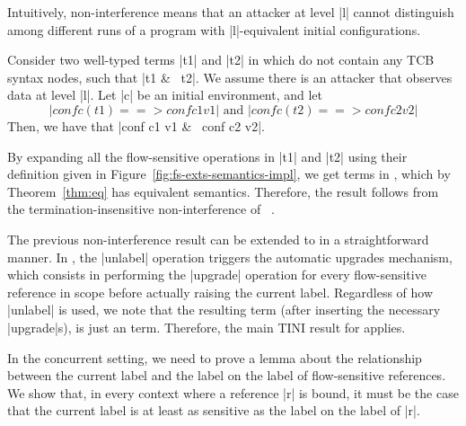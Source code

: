 Intuitively, non-interference means that an attacker at level |l|
cannot distinguish among different runs of a program with
|l|-equivalent initial configurations.

\begin{theorem}
  Consider two well-typed terms |t1| and |t2| in
  \liofs{} which do not contain any TCB syntax nodes, such that |t1 &~
  t2|. We assume there is an attacker that observes data at level
  |l|. Let |c| be an initial environment, and let
\[
    |conf c (t1) ==> conf c1 v1|\mbox{ and }
    |conf c (t2) ==> conf c2 v2|
\]
  Then, we have that |conf c1 v1 &~ conf c2 v2|.
\end{theorem}

\begin{proofsketch}
  By expanding all the flow-sensitive operations in |t1| and |t2| using their
  definition given in Figure~\ref{fig:fs-exts-semantics-impl}, we get
  terms in \lio{}, which by Theorem~\ref{thm:eq} has equivalent
  semantics. Therefore, the result follows from the
  termination-insensitive non-interference of \lio{}~\citep{stefan:lio}.
\end{proofsketch}

\begin{corollary}
  The previous non-interference result can be extended to \lioafs{} in
  a straightforward manner. In \lioafs{}, the |unlabel| operation
  triggers the automatic upgrades mechanism, which consists in
  performing the |upgrade| operation for every flow-sensitive
  reference in scope before actually raising the current label.
  Regardless of how |unlabel| is used, we note that the resulting term
  (after inserting the necessary |upgrade|s), is just an \liofs{}
  term. Therefore, the main TINI result for \liofs{} applies.


\end{corollary}

In the concurrent setting, we need to prove a lemma about the
relationship between the current label and the label on the label of
flow-sensitive references. We show that, in every context where a
reference |r| is bound, it must be the case that the current label is
at least as sensitive as the label on the label of |r|.

